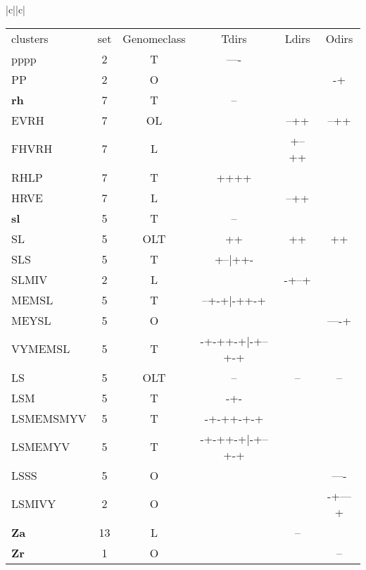 \documentclass[table,
12pt, %
a4paper, %
oneside, %
headinclude,footinclude, %
BCOR5mm, %
]{scrartcl}
\begin{document}
\begin{table}[htbp]
\begin{adjustbox}{width=\textwidth,center}
\begin{tabular}{|c||c|}
      \begin{tabular}{l ccccc}
        clusters    & set & Genomeclass & Tdirs           & Ldirs & Odirs  \\
        \rowcolor{shadecolor}
        pppp        & 2   & T           & ----            &       &        \\
        PP          & 2   & O           &                 &       & -+     \\
        \rowcolor{white}
        \textbf{rh} & 7   & T           & --              &       &        \\
        EVRH        & 7   & OL          &                 & --++  & --++   \\
        FHVRH       & 7   & L           &                 & +--++ &        \\
        RHLP        & 7   & T           & ++++            &       &        \\
        HRVE        & 7   & L           &                 & --++  &        \\
        \rowcolor{shadecolor}
        \textbf{sl} & 5   & T           & --              &       &        \\
        SL          & 5   & OLT         & ++              & ++    & ++     \\
        SLS         & 5   & T           & +--|++-         &       &        \\
        SLMIV       & 2   & L           &                 & -+--+ &        \\
        MEMSL       & 5   & T           & --+-+|-++-+     &       &        \\
        MEYSL       & 5   & O           &                 &       & ----+  \\
        VYMEMSL     & 5   & T           & -+-++-+|-+--+-+ &       &        \\
        LS          & 5   & OLT         & --              & --    & --     \\
        LSM         & 5   & T           & -+-             &       &        \\
        LSMEMSMYV   & 5   & T           & -+-++-+-+       &       &        \\
        LSMEMYV     & 5   & T           & -+-++-+|-+--+-+ &       &        \\
        LSSS        & 5   & O           &                 &       & ----   \\
        LSMIVY      & 2   & O           &                 &       & -+---+ \\
        \rowcolor{white}
        \textbf{Za} & 13  & L           &                 & --    &        \\
        \rowcolor{shadecolor}
        \textbf{Zr} & 1   & O           &                 &       & --     \\
      \end{tabular} \\ \hline
    \end{tabular}
    \label{table:ara2}
  \end{adjustbox}
\end{table}
\end{document}
